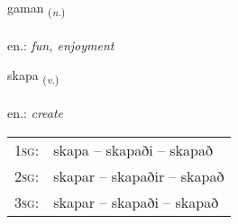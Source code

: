 \documentclass[frontgrid, backgrid]{flacards}\usepackage[]{graphicx}\usepackage[]{xcolor}
\begin{document}
\renewcommand{\flhead}{\vskip5pt \fboxsep=0pt {\small\bfseries\footnotesize Nafnorð | Noun}}
\renewcommand{\fcfoot}{\vskip5pt \fboxsep=0pt \hspace{2pt}{\small\bfseries\footnotesize 1K}}

\renewcommand{\blhead}{\vskip5pt {\small\bfseries\footnotesize Nafnorð | Noun }}
\renewcommand{\bcfoot}{\vskip5pt \hspace{2pt}{\small\bfseries\footnotesize 1K}}


{gaman \small{\textsubscript{(\textit{n.})}} \\[1ex] %
\textphonetic{[kaːman]} \\
en.: \emph{fun, enjoyment} \\  [2ex]
\renewcommand*{\arraystretch}{0.8}
}

\renewcommand{\flhead}{\vskip5pt \fboxsep=0pt {\small\bfseries\footnotesize Sagnorð | Verb}}
\renewcommand{\fcfoot}{\vskip5pt \fboxsep=0pt \hspace{2pt}{\small\bfseries\footnotesize 1K}}

\renewcommand{\blhead}{\vskip5pt {\small\bfseries\footnotesize Sagnorð | Verb }}
\renewcommand{\bcfoot}{\vskip5pt \hspace{2pt}{\small\bfseries\footnotesize 1K}}


{skapa \small{\textsubscript{(\textit{v.})}} \\[1ex] %
\textphonetic{[skaːpa]} \\
en.: \emph{create} \\  [2ex]
\renewcommand*{\arraystretch}{0.8}
\begin{tabular}{p{1cm}l}
\textsc{1sg}: & skapa -- skapaði -- skapað \\ 
\textsc{2sg}: & skapar -- skapaðir -- skapað \\ 
\textsc{3sg}: & skapar -- skapaði -- skapað \\ 
\end{tabular}
}
\end{document}
